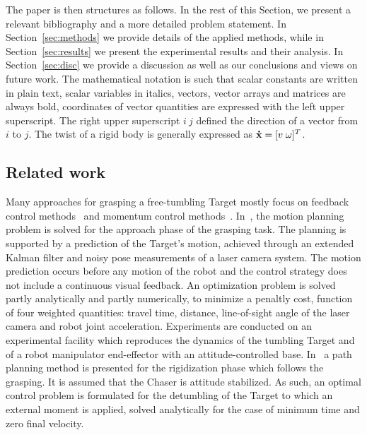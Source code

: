 The paper is then structures as follows. In the rest of this Section, we present a relevant bibliography and a more detailed problem statement. In Section~\ref{sec:methods} we provide details of the applied methods, while in Section~\ref{sec:results} we present the experimental results and their analysis. In Section~\ref{sec:disc} we provide a discussion as well as our conclusions and views on future work. The mathematical notation is such that scalar constants are written in plain text, scalar variables in italics, vectors, vector arrays and matrices are always bold, coordinates of vector quantities are expressed with the left upper superscript. The right upper superscript $i\:j$ defined the direction of a vector from $i$ to $j$. The twist of a rigid body is generally expressed as $\boldsymbol {\mathrm{\dot{x}}}=[v\;\omega]^T$.
%
%
\subsection{Related work}
\label{sec:related_work}
%
Many approaches for grasping a free-tumbling Target mostly focus on feedback control methods~\cite{moosavian2007free}\cite{dlr96736} and momentum control methods~\cite{yoshida2006capture}. In~\cite{aghili2012prediction}, the motion planning problem is solved for the approach phase of the grasping task. The planning is supported by a prediction of the Target's motion, achieved through an extended Kalman filter and noisy pose measurements of a laser camera system. The motion prediction occurs before any motion of the robot and the control strategy does not include a continuous visual feedback. An optimization problem is solved partly analytically and partly numerically, to minimize a penaltly cost, function of four weighted quantities: travel time, distance, line-of-sight angle of the laser camera and robot joint acceleration. %
Experiments are conducted on an experimental facility which reproduces the dynamics of the tumbling Target and of a robot manipulator end-effector with an attitude-controlled base. In~\cite{aghili2009optimal} a path planning method is presented for the rigidization phase which follows the grasping. It is assumed that the Chaser is attitude stabilized. As such, an optimal control problem is formulated for the detumbling of the Target to which an external moment is applied, solved analytically for the case of minimum time and zero final velocity.

